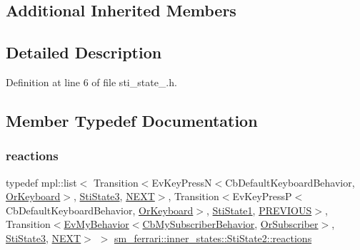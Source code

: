 \subsection*{Additional Inherited Members}


\subsection{Detailed Description}


Definition at line 6 of file sti\+\_\+state\+\_.\+h.



\subsection{Member Typedef Documentation}
\mbox{\label{structsm__ferrari_1_1inner__states_1_1StiState2_a7d4fde8004c6246634ada4f85a371b9f}} 
\subsubsection{\texorpdfstring{reactions}{reactions}}
{\footnotesize\ttfamily typedef mpl\+::list$<$ Transition$<$Ev\+Key\+PressN$<$Cb\+Default\+Keyboard\+Behavior, \hyperlink{classsm__ferrari_1_1OrKeyboard}{Or\+Keyboard}$>$, \hyperlink{structsm__ferrari_1_1inner__states_1_1StiState3}{Sti\+State3}, \hyperlink{structsm__ferrari_1_1inner__states_1_1StiState2_1_1NEXT}{N\+E\+XT}$>$, Transition$<$Ev\+Key\+PressP$<$Cb\+Default\+Keyboard\+Behavior, \hyperlink{classsm__ferrari_1_1OrKeyboard}{Or\+Keyboard}$>$, \hyperlink{structsm__ferrari_1_1inner__states_1_1StiState1}{Sti\+State1}, \hyperlink{structsm__ferrari_1_1inner__states_1_1StiState2_1_1PREVIOUS}{P\+R\+E\+V\+I\+O\+US}$>$, Transition$<$\hyperlink{structsm__ferrari_1_1cl__subscriber_1_1EvMyBehavior}{Ev\+My\+Behavior}$<$\hyperlink{classsm__ferrari_1_1cl__subscriber_1_1CbMySubscriberBehavior}{Cb\+My\+Subscriber\+Behavior}, \hyperlink{classsm__ferrari_1_1OrSubscriber}{Or\+Subscriber}$>$, \hyperlink{structsm__ferrari_1_1inner__states_1_1StiState3}{Sti\+State3}, \hyperlink{structsm__ferrari_1_1inner__states_1_1StiState2_1_1NEXT}{N\+E\+XT}$>$ $>$ \hyperlink{structsm__ferrari_1_1inner__states_1_1StiState2_a7d4fde8004c6246634ada4f85a371b9f}{sm\+\_\+ferrari\+::inner\+\_\+states\+::\+Sti\+State2\+::reactions}}



